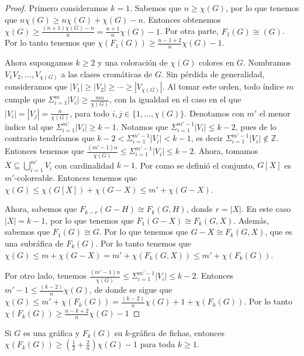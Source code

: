        
        \begin{proof}
        Primero consideramos $k=1$. Sabemos que $n \geq \chi(G)$, por lo que
        tenemos que $n\chi(G) \geq n\chi(G) + \chi(G) -n$. Entonces obtenemos
        $\chi (G) \geq \frac{(n+1)\chi(G)-n}{n} = \frac{n+1}{n}\chi (G) -1$.
        Por otra parte, $F_1(G) \cong (G)$. Por lo tanto tenemos que
        $\chi(F_1(G)) \geq \frac{n-1+2}{n} \chi(G) -1$.
        
            Ahora supongamos $k \geq 2$ y una coloraci\'on de $\chi(G)$ colores
            en $G$. Nombramos $V_1 V_2, \dots, V_{\chi(G)}$ a las clases
            crom\'aticas de $G$. Sin p\'erdida de generalidad, consideramos que
            $|V_1|\geq |V_2|\geq \cdots \geq |V_{\chi(G)}|$. Al tomar este
            orden, todo \'indice $m$ cumple que $\Sigma_{i=1}^{m}|V_i| \geq
            \frac{mn}{\chi(G)}$, con la igualdad en el caso en el que $|V_i| =
            |V_j| = \frac{n}{\chi(G)}$, para todo $i,j \in \{1, \dots,
            \chi(G)\}$. Denotamos con $m'$ el menor \'indice tal que
            $\Sigma_{i=1}^{m'}|V_i| \geq k-1$. Notamos que
            $\Sigma_{i=1}^{m'-1}|V_i| \leq k-2$, pues de lo contrario
            tendr\'iamos que $k-2<\Sigma_{i=1}^{m'-1}|V_i| < k-1$, es decir
            $\Sigma_{i=1}^{m'-1}|V_i| \notin \mathbb{Z}$. Entonces tenemos que
            $\frac{(m'-1)n}{\chi(G)}\leq \Sigma_{i=1}^{m'-1}|V_i| \leq k-2$.
            Ahora, tomamos $X \subseteq \bigcup_{i=1}^{m'} V_i$ con cardinalidad
            $k-1$. Por como se defini\'o el conjunto, $G[X]$ es $m'$-coloreable.
            Entonces tenemos que  $\chi(G) \leq \chi(G[X])+\chi(G-X) \leq m' +
            \chi(G-X)$.
        
            Ahora, sabemos que $F_{k-r}(G-H) \cong F_k(G,H)$, donde $r = |X|$.
            En este caso $|X| = k-1$, por lo que tenemos que $F_1(G-X) \cong
            F_k(G,X)$. Adem\'as, sabemos que $F_1(G) \cong G$. Por lo que
            tenemos que $G-X \cong F_k(G,X)$, que es una subr\'afica de
            $F_k(G)$. Por lo tanto tenemos que $\chi(G) \leq m + \chi(G-X) = m'
            + \chi(F_k(G,X)) \leq m' + \chi(F_k(G))$. 
            
            Por otro lado, tenemos $\frac{(m'-1)n}{\chi(G)}\leq
            \Sigma_{i=1}^{m'-1}|V_i| \leq k-2$. Entonces $m'-1 \leq
            \frac{(k-2)}{n}\chi(G)$, de donde se sigue que $\chi(G) \leq m' +
            \chi(F_k(G)) = \frac{(k-2)}{n}\chi(G) +1 + \chi(F_k(G))$. Por lo
            tanto $\chi(F_k(G)) \geq \frac{n-k+2}{n} \chi(G) -1$
        \end{proof}
    \begin{teorema}
    \label{relacion num cromatico indep k}
        Si $G$ es una gr\'afica y $F_k(G)$ su $k$-gr\'afica de fichas, entonces
        $\chi (F_k(G)) \geq (\frac{1}{2}+ \frac{2}{n})\chi(G) -1 $ para toda $k
        \geq 1$.
    \end{teorema}
    
